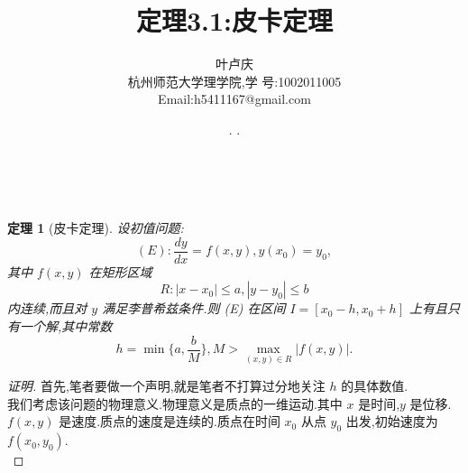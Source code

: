 \documentclass[a4paper, 12pt]{article} %
\makeatletter
\newtheorem*{adtheorem}{定理}
\newenvironment{theorem}
{\bigskip\begin{mdframed}[backgroundcolor=gray!40,rightline=false,leftline=false,topline=false,bottomline=false]\begin{adtheorem}}
    {\end{adtheorem}\end{mdframed}\bigskip}
\renewcommand{\maketitle}{ %
  \renewcommand\refname{参考文献}
  \newcommand{\D}{\displaystyle}\newcommand{\ri}{\Rightarrow}
  \newcommand{\ds}{\displaystyle} \renewcommand{\ni}{\noindent}
  \newcommand{\pa}{\partial} \newcommand{\Om}{\Omega}
  \newcommand{\om}{\omega} \newcommand{\sik}{\sum_{i=1}^k}
  \newcommand{\vov}{\Vert\omega\Vert} \newcommand{\Umy}{U_{\mu_i,y^i}}
  \newcommand{\lamns}{\lambda_n^{^{\scriptstyle\sigma}}}
  \newcommand{\chiomn}{\chi_{_{\Omega_n}}}
  \newcommand{\ullim}{\underline{\lim}} \newcommand{\bsy}{\boldsymbol}
  \newcommand{\mvb}{\mathversion{bold}} \newcommand{\la}{\lambda}
  \newcommand{\La}{\Lambda} \newcommand{\va}{\varepsilon}
  \newcommand{\be}{\beta} \newcommand{\al}{\alpha}
  \newcommand{\dis}{\displaystyle} \newcommand{\R}{{\mathbb R}}
  \newcommand{\N}{{\mathbb N}} \newcommand{\cF}{{\mathcal F}}
  \newcommand{\gB}{{\mathfrak B}} \newcommand{\eps}{\epsilon}
  \begin{flushright} %
    {\LARGE\@title} %
    
    \vspace{50pt} %
    
    {\large\@author} %
    \\\@date %
    
    \vspace{40pt} %
  \end{flushright}
}
\makeatother
\begin{document}
\begin{CJK}{UTF8}{gkai}
  \title{\textbf{定理3.1:皮卡定理}}
  \author{\small{叶卢庆}\\{\small{杭州师范大学理学院,学
        号:1002011005}}\\{\small{Email:h5411167@gmail.com}}} %
  \renewcommand{\today}{\number\year. \number\month. \number\day}
  \date{\today} %
  
  
  
  \maketitle %
  
  
  
  
  
  
  
  \begin{theorem}[皮卡定理]
 设初值问题:
$$
(E):\frac{dy}{dx}=f(x,y),y(x_0)=y_0,
$$
其中 $f(x,y)$ 在矩形区域
$$
R:|x-x_0|\leq a,|y-y_0|\leq b
$$
内连续,而且对 $y$ 满足李普希兹条件.则 (E) 在区间 $I=[x_0-h,x_0+h]$ 上有且只
有一个解,其中常数
$$
h=\min\{a,\frac{b}{M}\},M>\max_{(x,y)\in R}|f(x,y)|.
$$
\end{theorem}
\begin{proof}[证明]
首先,笔者要做一个声明,就是笔者不打算过分地关注 $h$ 的具体数值.\\

我们考虑该问题的物理意义.物理意义是质点的一维运动.其中 $x$ 是时间,$y$
  是位移.$f(x,y)$ 是速度.质点的速度是连续的.质点在时间 $x_0$ 从点 $y_0$ 出发,初始速度为 $f(x_0,y_0)$.\\


\end{proof}
\end{CJK}
\end{document}
